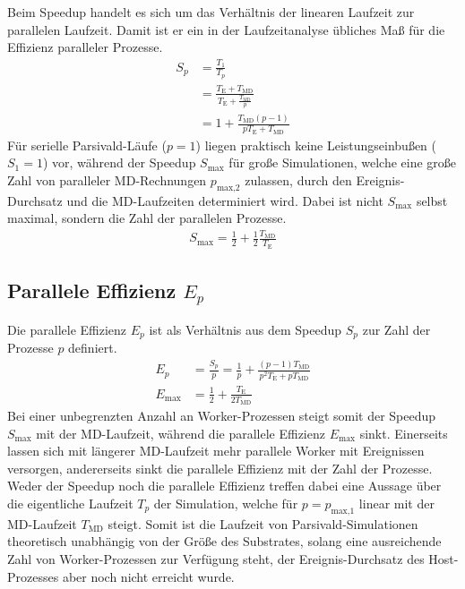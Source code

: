 Beim Speedup handelt es sich um das Verhältnis der linearen Laufzeit zur parallelen Laufzeit.
Damit ist er ein in der Laufzeitanalyse übliches Maß für die Effizienz paralleler Prozesse.
\begin{align}
  S_p & = \frac{T_1}{T_p}                                                     \\
      & = \frac{T_\text{E} + T_\text{MD}}{T_\text{E} + \frac{T_\text{MD}}{p}} \\
      & = 1 + \frac{T_\text{MD} (p - 1)}{p T_\text{E} + T_\text{MD}}
\end{align}
Für serielle Parsivald-Läufe ($p=1$) liegen praktisch keine Leistungseinbußen ($S_1=1$) vor, während der Speedup $S_\text{max}$ für große Simulationen, welche eine große Zahl von paralleler MD-Rechnungen $p_\text{max,2}$ zulassen, durch den Ereignis-Durchsatz und die MD-Laufzeiten determiniert wird.
Dabei ist nicht $S_\text{max}$ selbst maximal, sondern die Zahl der parallelen Prozesse.
\begin{align}
  S_\text{max} = \frac{1}{2} + \frac{1}{2}\frac{T_\text{MD}}{T_\text{E}}
\end{align}

\subsection{Parallele Effizienz $E_p$}

Die parallele Effizienz $E_p$ ist als Verhältnis aus dem Speedup $S_p$ zur Zahl der Prozesse $p$ definiert.
\begin{align}
  E_p & = \frac{S_p}{p} = \frac{1}{p} + \frac{(p-1) T_\text{MD}}{p^2 T_\text{E} + p T_\text{MD}} \\
  E_\text{max} & = \frac{1}{2} + \frac{T_\text{E}}{2 T_\text{MD}}
\end{align}
Bei einer unbegrenzten Anzahl an Worker-Prozessen steigt somit der Speedup $S_\text{max}$ mit der MD-Laufzeit, während die parallele Effizienz $E_\text{max}$ sinkt.
Einerseits lassen sich mit längerer MD-Laufzeit mehr parallele Worker mit Ereignissen versorgen, andererseits sinkt die parallele Effizienz mit der Zahl der Prozesse.
Weder der Speedup noch die parallele Effizienz treffen dabei eine Aussage über die eigentliche Laufzeit $T_p$ der Simulation, welche für $p = p_\text{max,1}$ linear mit der MD-Laufzeit $T_\text{MD}$ steigt.
Somit ist die Laufzeit von Parsivald-Simulationen theoretisch unabhängig von der Größe des Substrates, solang eine ausreichende Zahl von Worker-Prozessen zur Verfügung steht, der Ereignis-Durchsatz des Host-Prozesses aber noch nicht erreicht wurde.

